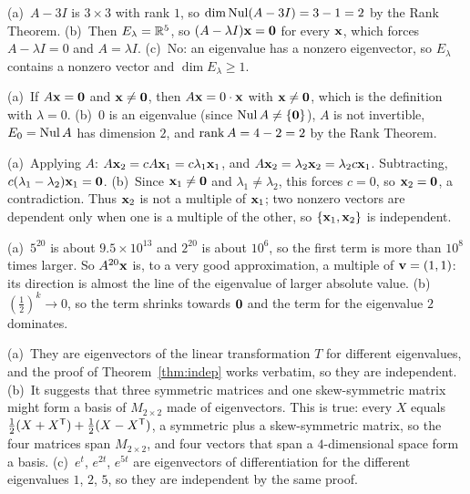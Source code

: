\documentclass[11pt]{article}
\begin{document}
\begin{description}[leftmargin=0pt,itemsep=5pt]
  \item[Pause and think \ref{think:freevars}.] (a)~$A-3I$ is $3\times3$ with rank $1$, so $\dim\operatorname{Nul}(A-3I)=3-1=2$ by the Rank Theorem. (b)~Then $E_\lambda=\mathbb{R}^5$, so $(A-\lambda I)\mathbf{x}=\mathbf{0}$ for every $\mathbf{x}$, which forces $A-\lambda I=0$ and $A=\lambda I$. (c)~No: an eigenvalue has a nonzero eigenvector, so $E_\lambda$ contains a nonzero vector and $\dim E_\lambda\ge1$.
  \item[Pause and think \ref{think:zero}.] (a)~If $A\mathbf{x}=\mathbf{0}$ and $\mathbf{x}\neq\mathbf{0}$, then $A\mathbf{x}=0\cdot\mathbf{x}$ with $\mathbf{x}\neq\mathbf{0}$, which is the definition with $\lambda=0$. (b)~$0$ is an eigenvalue (since $\operatorname{Nul} A\neq\{\mathbf{0}\}$), $A$ is not invertible, $E_0=\operatorname{Nul} A$ has dimension $2$, and $\operatorname{rank} A=4-2=2$ by the Rank Theorem.
  \item[Pause and think \ref{think:two}.] (a)~Applying $A$: $A\mathbf{x}_2=cA\mathbf{x}_1=c\lambda_1\mathbf{x}_1$, and $A\mathbf{x}_2=\lambda_2\mathbf{x}_2=\lambda_2c\mathbf{x}_1$. Subtracting, $c(\lambda_1-\lambda_2)\mathbf{x}_1=\mathbf{0}$. (b)~Since $\mathbf{x}_1\neq\mathbf{0}$ and $\lambda_1\neq\lambda_2$, this forces $c=0$, so $\mathbf{x}_2=\mathbf{0}$, a contradiction. Thus $\mathbf{x}_2$ is not a multiple of $\mathbf{x}_1$; two nonzero vectors are dependent only when one is a multiple of the other, so $\{\mathbf{x}_1,\mathbf{x}_2\}$ is independent.
  \item[Pause and think \ref{think:powers}.] (a)~$5^{20}$ is about $9.5\times10^{13}$ and $2^{20}$ is about $10^6$, so the first term is more than $10^8$ times larger. So $A^{20}\mathbf{x}$ is, to a very good approximation, a multiple of $\mathbf{v}=(1,1)$: its direction is almost the line of the eigenvalue of larger absolute value. (b)~$(\tfrac12)^k\to0$, so the term shrinks towards $\mathbf{0}$ and the term for the eigenvalue $2$ dominates.
  \item[Pause and think \ref{think:newspaces}.] (a)~They are eigenvectors of the linear transformation $T$ for different eigenvalues, and the proof of Theorem~\ref{thm:indep} works verbatim, so they are independent. (b)~It suggests that three symmetric matrices and one skew-symmetric matrix might form a basis of $M_{2\times2}$ made of eigenvectors. This is true: every $X$ equals $\tfrac12(X+X^{\mathsf T})+\tfrac12(X-X^{\mathsf T})$, a symmetric plus a skew-symmetric matrix, so the four matrices span $M_{2\times2}$, and four vectors that span a $4$-dimensional space form a basis. (c)~$e^t$, $e^{2t}$, $e^{5t}$ are eigenvectors of differentiation for the different eigenvalues $1$, $2$, $5$, so they are independent by the same proof.

\end{description}
\end{document}
